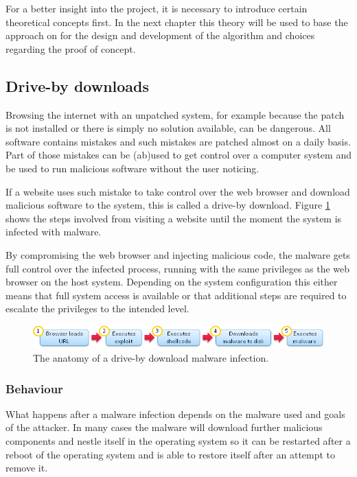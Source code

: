 For a better insight into the project, it is necessary to introduce certain theoretical concepts first. In the next chapter this theory will be used to base the approach on for the design and development of the algorithm and choices regarding the proof of concept.

\subsection{Drive-by downloads}

Browsing the internet with an unpatched system, for example because the patch is not installed or there is simply no solution available, can be dangerous. All software contains mistakes and such mistakes are patched almost on a daily basis. Part of those mistakes can be (ab)used to get control over a computer system and be used to run malicious software without the user noticing.

If a website uses such mistake to take control over the web browser and download malicious software to the system, this is called a drive-by download\cite{Le2013}. Figure \ref{fig:dbdownload} shows the steps involved from visiting a website until the moment the system is infected with malware.

By compromising the web browser and injecting malicious code, the malware gets full control over the infected process, running with the same privileges as the web browser on the host system. Depending on the system configuration this either means that full system access is available or that additional steps are required to escalate the privileges to the intended level.


\begin{figure}[h]
    \centering
    \includegraphics[width=12cm]{Images/drive-by-download.png}
    \caption{The anatomy of a drive-by download malware infection. \cite{dbdownload-anatomy}}
    \label{fig:dbdownload}
\end{figure}

\subsubsection{Behaviour}

What happens after a malware infection depends on the malware used and goals of the attacker. In many cases the malware will download further malicious components and nestle itself in the operating system so it can be restarted after a reboot of the operating system and is able to restore itself after an attempt to remove it.

